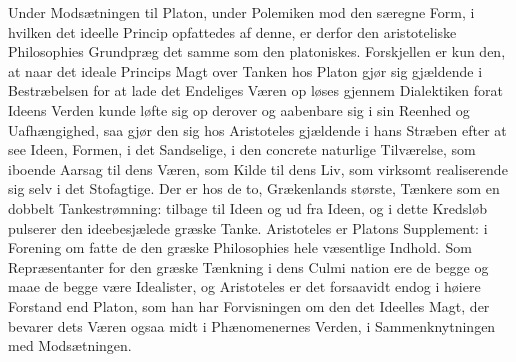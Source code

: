 \documentclass[12pt,a4paper]{book}
\begin{document}
Under Modsætningen til Platon, under Polemiken mod
den særegne Form, i hvilken det ideelle Princip opfattedes af
denne, er derfor den aristoteliske Philosophies Grundpræg det
samme som den platoniskes. Forskjellen er kun den, at naar
det ideale Princips Magt over Tanken hos Platon gjør sig
gjældende i Bestræbelsen for at lade det Endeliges Væren op\-%
løses gjennem Dialektiken forat Ideens Verden kunde løfte sig
op derover og aabenbare sig i sin Reenhed og Uafhængighed,
saa gjør den sig hos Aristoteles gjældende i hans Stræben
efter at see Ideen, Formen, i det Sandselige, i den concrete
naturlige Tilværelse, som iboende Aarsag til dens Væren, som
Kilde til dens Liv, som virksomt realiserende sig selv i det
Stofagtige. Der er hos de to, Grækenlands største, Tænkere
som en dobbelt Tankestrømning: tilbage til Ideen og ud fra
Ideen, og i dette Kredsløb pulserer den ideebesjælede græske
Tanke. Aristoteles er Platons Supplement: i Forening om\-%
fatte de den græske Philosophies hele væsentlige Indhold.
Som Repræsentanter for den græske Tænkning i dens Culmi\-%
nation ere de begge og maae de begge være Idealister, og
Aristoteles er det forsaavidt endog i høiere Forstand end
Platon, som han har Forvisningen om den det Ideelles Magt,
der bevarer dets Væren ogsaa midt i Phænomenernes Verden,
i Sammenknytningen med Modsætningen.
\end{document}

